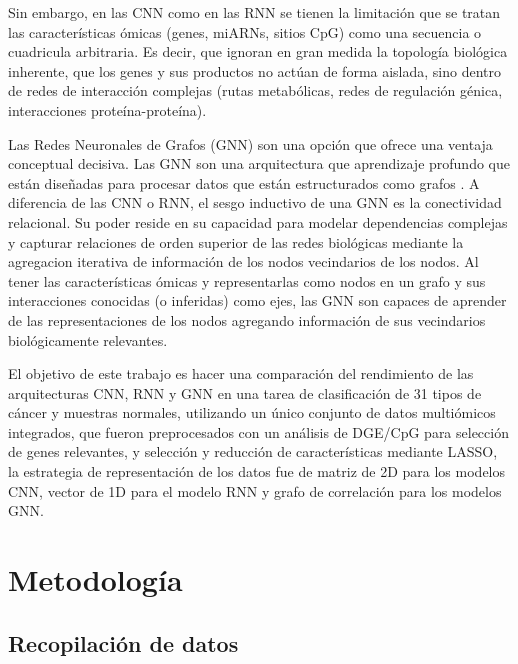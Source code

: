 \documentclass[preprint,number]{elsarticle}
\begin{document}
Sin embargo, en las CNN como en las RNN se tienen la limitación que se tratan las características ómicas (genes, miARNs, sitios CpG) como una secuencia o cuadricula arbitraria. Es decir, que ignoran en gran medida la topología biológica inherente, que los genes y sus productos no actúan de forma aislada, sino dentro de redes de interacción complejas (rutas metabólicas, redes de regulación génica, interacciones proteína-proteína).

Las Redes Neuronales de Grafos (GNN) son una opción que ofrece una ventaja conceptual decisiva. Las GNN son una arquitectura que aprendizaje profundo que están diseñadas para procesar datos que están estructurados como grafos \cite{jiang2019semi,velickovic2017graph}. A diferencia de las CNN o RNN, el sesgo inductivo de una GNN es la conectividad relacional. Su poder reside en su capacidad para modelar dependencias complejas y capturar relaciones de orden superior de las redes biológicas mediante la agregacion iterativa de información de los nodos vecindarios de los nodos. Al tener las características ómicas y representarlas como nodos en un grafo y sus interacciones conocidas (o inferidas) como ejes, las GNN son capaces de aprender de las representaciones de los nodos agregando información de sus vecindarios biológicamente relevantes. 

El objetivo de este trabajo es hacer una comparación del rendimiento de las arquitecturas CNN, RNN y GNN en una tarea de clasificación de 31 tipos de cáncer y muestras normales, utilizando un único conjunto de datos multiómicos integrados, que fueron preprocesados con un análisis de DGE/CpG para selección de genes relevantes, y selección y reducción de características mediante LASSO, la estrategia de representación de los datos fue de matriz de 2D para los modelos CNN, vector de 1D para el modelo RNN y grafo de correlación para los modelos GNN.


\section{Metodología}

\subsection{Recopilación de datos}
\end{document}
